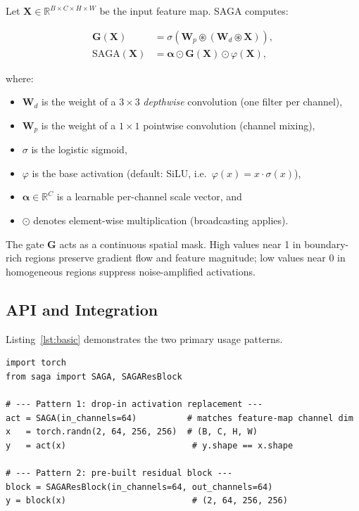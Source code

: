 \documentclass[preprint,12pt]{elsarticle}
\begin{document}
Let $\mathbf{X} \in \mathbb{R}^{B \times C \times H \times W}$ be the input
feature map.
SAGA computes:

\begin{align}
  \mathbf{G}(\mathbf{X})
    &= \sigma\!\left(\mathbf{W}_p \circledast
       \left(\mathbf{W}_d \circledast \mathbf{X}\right)\right), \label{eq:gate}\\
  \text{SAGA}(\mathbf{X})
    &= \boldsymbol{\alpha} \odot \mathbf{G}(\mathbf{X}) \odot \varphi(\mathbf{X}),
    \label{eq:saga}
\end{align}

\noindent where:
\begin{itemize}
  \item $\mathbf{W}_d$ is the weight of a $3 \times 3$ \emph{depthwise}
        convolution (one filter per channel),
  \item $\mathbf{W}_p$ is the weight of a $1 \times 1$ pointwise convolution
        (channel mixing),
  \item $\sigma$ is the logistic sigmoid,
  \item $\varphi$ is the base activation (default: SiLU, i.e.\
        $\varphi(x) = x \cdot \sigma(x)$),
  \item $\boldsymbol{\alpha} \in \mathbb{R}^C$ is a learnable per-channel
        scale vector, and
  \item $\odot$ denotes element-wise multiplication (broadcasting applies).
\end{itemize}

The gate $\mathbf{G}$ acts as a continuous spatial mask.
High values near 1 in boundary-rich regions preserve gradient flow and
feature magnitude; low values near 0 in homogeneous regions suppress
noise-amplified activations.

\subsection{API and Integration}

Listing~\ref{lst:basic} demonstrates the two primary usage patterns.

\begin{lstlisting}[caption={Basic usage of the SAGA package.},
                   label={lst:basic}]
import torch
from saga import SAGA, SAGAResBlock

# --- Pattern 1: drop-in activation replacement ---
act = SAGA(in_channels=64)          # matches feature-map channel dim
x   = torch.randn(2, 64, 256, 256)  # (B, C, H, W)
y   = act(x)                         # y.shape == x.shape

# --- Pattern 2: pre-built residual block ---
block = SAGAResBlock(in_channels=64, out_channels=64)
y = block(x)                         # (2, 64, 256, 256)
\end{lstlisting}
\end{document}
